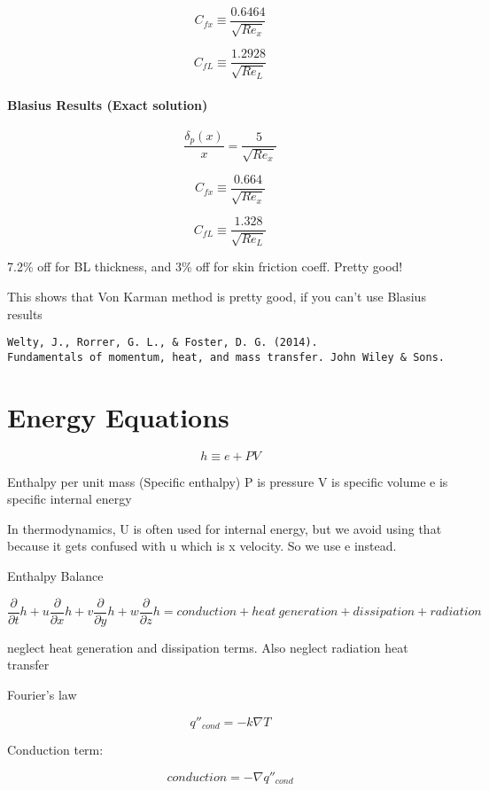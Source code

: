 \documentclass[11pt]{article}
\begin{document}
$$C_{fx} \equiv \frac{0.6464}{ \sqrt{Re_x}}  $$

$$C_{fL} \equiv \frac{1.2928 }{\sqrt{Re_L}}  $$

\subsection{Blasius Results (Exact solution) }


$$ \frac{\delta_p (x)}{x} =   \frac{5}{\sqrt{Re_x} }$$


$$C_{fx} \equiv \frac{0.664}{ \sqrt{Re_x}}  $$

$$C_{fL} \equiv \frac{1.328}{\sqrt{Re_L}}  $$

7.2\% off for BL thickness, and 3\% off for skin friction coeff.
Pretty good!

This shows that Von Karman method is pretty good, if you can't use Blasius results 

\begin{verbatim}
Welty, J., Rorrer, G. L., & Foster, D. G. (2014). 
Fundamentals of momentum, heat, and mass transfer. John Wiley & Sons.
\end{verbatim}

\part{Energy Equations}


$$h \equiv e + PV$$

Enthalpy per unit mass (Specific enthalpy)
P is pressure
V is specific volume
e is specific internal energy

In thermodynamics, U is often used for internal energy, but we avoid using that because it gets confused with u which is x velocity. So we use e instead.

Enthalpy Balance

\begin{equation}
\frac{\partial }{\partial t} h + u \frac{\partial}{\partial x} h + v \frac{\partial }{\partial y} h + w \frac{\partial }{\partial z} h  = conduction + heat \ generation + dissipation+radiation
\end{equation}

neglect heat generation and dissipation terms. Also neglect radiation heat transfer

Fourier's law

$$q''_{cond} = - k \nabla T$$

Conduction term:

$$conduction = -\nabla q''_{cond}$$
\end{document}
